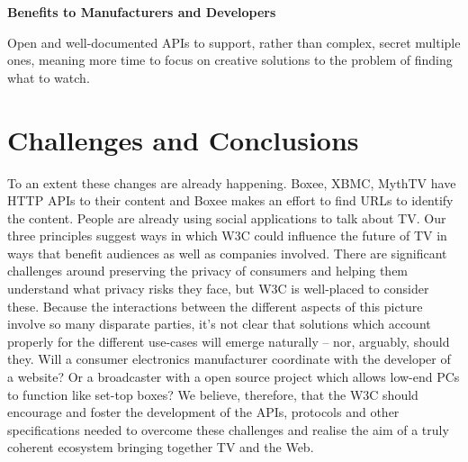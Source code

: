 \documentclass[]{article}%
\begin{document}
{\bf{Benefits to Manufacturers and Developers}}

Open and well-documented APIs to support, rather than complex, secret multiple ones, meaning more time to focus on creative solutions to the problem of finding what to watch.

\section{Challenges and Conclusions}

To an extent these changes are already happening. Boxee, XBMC, MythTV have HTTP APIs to their content and Boxee makes an effort to find URLs to identify the content. People are already using social applications to talk about TV. Our three principles suggest ways in which W3C could influence the future of TV in ways that benefit audiences as well as companies involved. There are significant challenges around preserving the privacy of consumers and helping them understand what privacy risks they face, but W3C is well-placed to consider these.
Because the interactions between the different aspects of this picture involve so many disparate parties, it's not clear that solutions which account properly for the different use-cases will emerge naturally -- nor, arguably, should they. Will a consumer electronics manufacturer coordinate with the developer of a website? Or a broadcaster with a open source project which allows low-end PCs to function like set-top boxes?
We believe, therefore, that the W3C should encourage and foster the development of the APIs, protocols and other specifications needed to overcome these challenges and realise the aim of a truly coherent ecosystem bringing together TV and the Web. 
\end{document}
